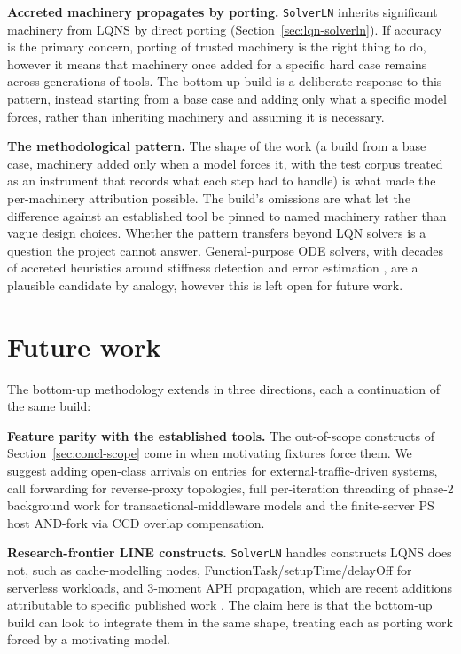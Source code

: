 \textbf{Accreted machinery propagates by porting.} \texttt{SolverLN} inherits significant machinery from LQNS by direct porting (Section~\ref{sec:lqn-solverln}). If accuracy is the primary concern, porting of trusted machinery is the right thing to do, however it means that machinery once added for a specific hard case remains across generations of tools. The bottom-up build is a deliberate response to this pattern, instead starting from a base case and adding only what a specific model forces, rather than inheriting machinery and assuming it is necessary.

\textbf{The methodological pattern.} The shape of the work (a build from a base case, machinery added only when a model forces it, with the test corpus treated as an instrument that records what each step had to handle) is what made the per-machinery attribution possible. The build's omissions are what let the difference against an established tool be pinned to named machinery rather than vague design choices. Whether the pattern transfers beyond LQN solvers is a question the project cannot answer. General-purpose ODE solvers, with decades of accreted heuristics around stiffness detection and error estimation \cite{shampine1997}, are a plausible candidate by analogy, however this is left open for future work.




\section{Future work}
\label{sec:concl-future}

The bottom-up methodology extends in three directions, each a continuation of the same build:

\textbf{Feature parity with the established tools.} The out-of-scope constructs of Section~\ref{sec:concl-scope} come in when motivating fixtures force them. We suggest adding open-class arrivals on entries for external-traffic-driven systems, call forwarding for reverse-proxy topologies, full per-iteration threading of phase-2 background work for transactional-middleware models and the finite-server PS host AND-fork via CCD overlap compensation. 

\textbf{Research-frontier LINE constructs.} \texttt{SolverLN} handles constructs LQNS does not, such as cache-modelling nodes, FunctionTask/setupTime/delayOff for serverless workloads, and 3-moment APH propagation, which are recent additions attributable to specific published work \cite{casale2024}. The claim here is that the bottom-up build can look to integrate them in the same shape, treating each as porting work forced by a motivating model.

